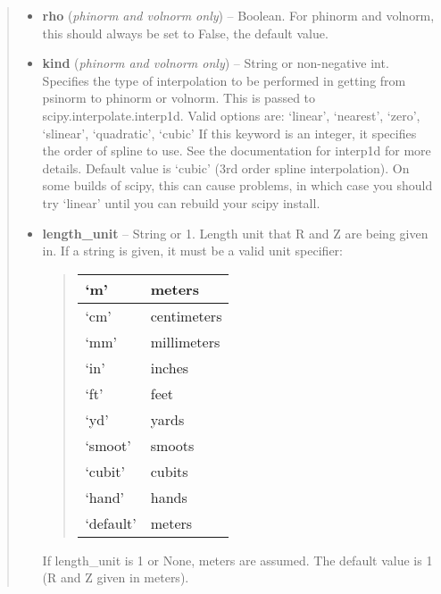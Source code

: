 \documentclass[letterpaper,10pt,english]{sphinxmanual}
\begin{document}
\begin{fulllineitems}
\begin{fulllineitems}
\begin{quote}
\begin{description}
\begin{itemize}
\item {} 
\textbf{rho} (\emph{phinorm and volnorm only}) --
Boolean.
For phinorm and volnorm,
this should always be set to False, the default value.

\item {} 
\textbf{kind} (\emph{phinorm and volnorm only}) --
String or non-negative int.
Specifies the type of interpolation to be performed in getting
from psinorm to phinorm or volnorm. This is passed to
scipy.interpolate.interp1d. Valid options are:
`linear', `nearest', `zero', `slinear', `quadratic', `cubic'
If this keyword is an integer, it specifies the order of spline
to use. See the documentation for interp1d for more details.
Default value is `cubic' (3rd order spline interpolation). On
some builds of scipy, this can cause problems, in which case
you should try `linear' until you can rebuild your scipy install.

\item {} 
\textbf{length\_unit} --
String or 1.
Length unit that R and Z are being given
in. If a string is given, it must be a valid unit specifier:
\begin{quote}

\begin{tabulary}{\linewidth}{|L|L|}
\hline

`m'
 & 
meters
\\\hline

`cm'
 & 
centimeters
\\\hline

`mm'
 & 
millimeters
\\\hline

`in'
 & 
inches
\\\hline

`ft'
 & 
feet
\\\hline

`yd'
 & 
yards
\\\hline

`smoot'
 & 
smoots
\\\hline

`cubit'
 & 
cubits
\\\hline

`hand'
 & 
hands
\\\hline

`default'
 & 
meters
\\\hline
\end{tabulary}

\end{quote}

If length\_unit is 1 or None, meters are assumed. The default
value is 1 (R and Z given in meters).


\end{itemize}
\end{description}
\end{quote}
\end{fulllineitems}
\end{fulllineitems}
\end{document}
